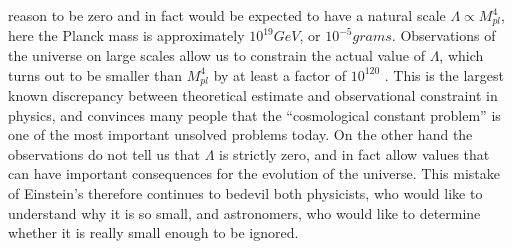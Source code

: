 reason to be zero and in fact would be expected to have a natural scale $\Lambda \propto M^4_{pl}$, here the Planck mass is approximately $10^{19} GeV$, or $10^{−5} grams$. Observations of the
universe on large scales allow us to constrain the actual value of $Λ$, which turns out to be
smaller than $M^4_{pl}$ by at least a factor of $10^{120}$ . This is the largest known discrepancy between
theoretical estimate and observational constraint in physics, and convinces many people that
the “cosmological constant problem” is one of the most important unsolved problems today.
On the other hand the observations do not tell us that $Λ$ is strictly zero, and in fact allow
values that can have important consequences for the evolution of the universe. This mistake
of Einstein’s therefore continues to bedevil both physicists, who would like to understand
why it is so small, and astronomers, who would like to determine whether it is really small
enough to be ignored.

